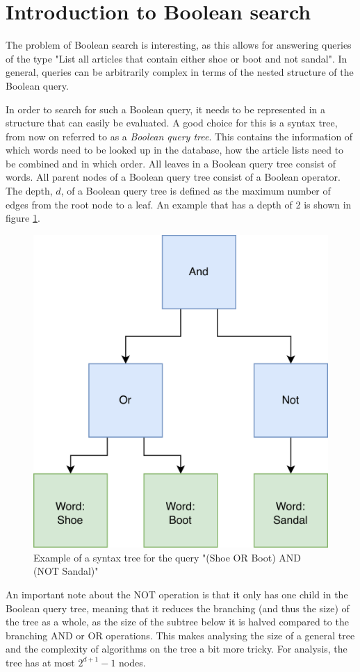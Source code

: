 \section{Introduction to Boolean search}

The problem of Boolean search is interesting, as this allows for answering queries of the type "List all articles that contain either shoe or boot and not sandal". In general, queries can be arbitrarily complex in terms of the nested structure of the Boolean query. 

In order to search for such a Boolean query, it needs to be represented in a structure that can easily be evaluated. A good choice for this is a syntax tree, from now on referred to as a \textit{Boolean query tree}. This contains the information of which words need to be looked up in the database, how the article lists need to be combined and in which order. All leaves in a Boolean query tree consist of words. All parent nodes of a Boolean query tree consist of a Boolean operator. The depth, $d$, of a Boolean query tree is defined as the maximum number of edges from the root node to a leaf. An example that has a depth of 2 is shown in figure \ref{fig:bool-st-example}.

\begin{figure}[ht!]
    \centering
    \includegraphics[width=.5\textwidth]{LaTeX/Figures/BooleanST.png}
    \caption{Example of a syntax tree for the query "(Shoe OR Boot) AND (NOT Sandal)"}
    \label{fig:bool-st-example}
\end{figure}

An important note about the NOT operation is that it only has one child in the Boolean query tree, meaning that it reduces the branching (and thus the size) of the tree as a whole, as the size of the subtree below it is halved compared to the branching AND or OR operations. This makes analysing the size of a general tree and the complexity of algorithms on the tree a bit more tricky. For analysis, the tree has at most $2^{d+1}-1$ nodes. 

